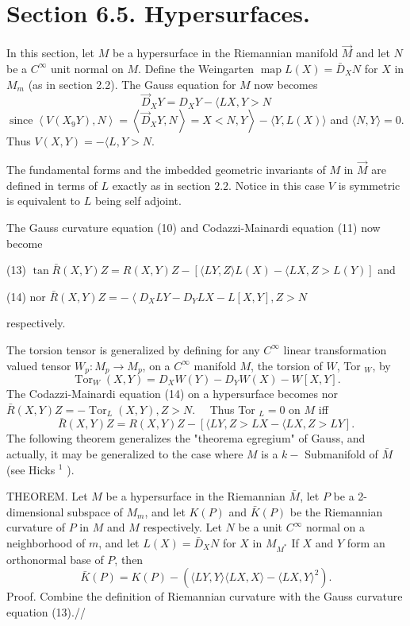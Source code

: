 \documentclass[10pt]{article}
\begin{document}
\section{Section 6.5. Hypersurfaces.}
In this section, let $M$ be a hypersurface in the Riemannian manifold $\vec{M}$ and let $N$ be a $C^{\infty}$ unit normal on $M$. Define the Weingarten $\operatorname{map} L(X)=\bar{D}_{X} N$ for $X$ in $M_{m}$ (as in section 2.2). The Gauss equation for $M$ now becomes
$$
\vec{D}_{X} Y=D_{X} Y-\langle L X, Y>N
$$
$\left.\operatorname{since}\left\langle V\left(X_{9} Y\right), N\right\rangle=\left\langle\vec{D}_{X} Y, N\right\rangle=X<N, Y\right\rangle-\langle Y, L(X)\rangle$ and $\langle N, Y\rangle=0$. Thus $V(X, Y)=-\langle L, Y>N$.

The fundamental forms and the imbedded geometric invariants of $M$ in $\vec{M}$ are defined in terms of $L$ exactly as in section $2.2$. Notice in this case $V$ is symmetric is equivalent to $L$ being self adjoint.

The Gauss curvature equation (10) and Codazzi-Mainardi equation (11) now become

(13) $\tan \bar{R}(X, Y) Z=R(X, Y) Z-[\langle L Y, Z\rangle L(X)-\langle L X, Z>L(Y)]$ and

(14) nor $\bar{R}(X, Y) Z=-\left\langle D_{X} L Y-D_{Y} L X-L[X, Y], Z>N\right.$

respectively.

The torsion tensor is generalized by defining for any $C^{\infty}$ linear transformation valued tensor $W_{p}: M_{p} \rightarrow M_{p}$, on a $C^{\infty}$ manifold $M$, the torsion of $W$, Tor $_{W}$, by
$$
\operatorname{Tor}_{W}(X, Y)=D_{X} W(Y)-D_{Y} W(X)-W[X, Y] .
$$
The Codazzi-Mainardi equation (14) on a hypersurface becomes nor $\bar{R}(X, Y) Z=-\operatorname{Tor}_{L}(X, Y), Z>N . \quad$ Thus Tor ${ }_{L}=0$ on $M$ iff
$$
\bar{R}(X, Y) Z=R(X, Y) Z-[\langle L Y, Z>L X-\langle L X, Z>L Y] .
$$
The following theorem generalizes the "theorema egregium" of Gauss, and actually, it may be generalized to the case where $M$ is a $k-$ Submanifold of $\bar{M}$ (see Hicks ${ }^{1}$ ).

THEOREM. Let $M$ be a hypersurface in the Riemannian $\bar{M}$, let $P$ be a 2-dimensional subspace of $M_{m}$, and let $K(P)$ and $\bar{K}(P)$ be the Riemannian curvature of $P$ in $M$ and $M$ respectively. Let $N$ be a unit $C^{\infty}$ normal on a neighborhood of $m$, and let $L(X)=\bar{D}_{X} N$ for $X$ in $M_{M^{*}}$ If $X$ and $Y$ form an orthonormal base of $P$, then
$$
\bar{K}(P)=K(P)-\left(\langle L Y, Y\rangle\langle L X, X\rangle-\langle L X, Y\rangle^{2}\right) .
$$
Proof. Combine the definition of Riemannian curvature with the Gauss curvature equation (13).//
\end{document}
